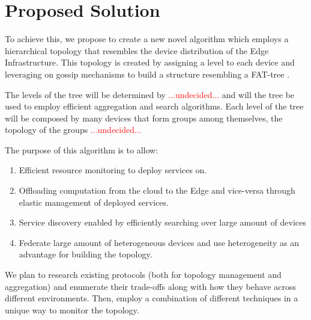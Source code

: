 \chapter{Proposed Solution}
\label{cha:proposed_sol}


To achieve this, we propose to create a new novel algorithm which employs a hierarchical topology that resembles the device distribution of the Edge Infrastructure. This topology is created by assigning a level to each device and leveraging on gossip mechanisms to build a structure resembling a FAT-tree \cite{}.

The levels of the tree will be determined by \textcolor{red}{...undecided...} and will the tree be used to employ efficient aggregation and search algorithms. Each level of the tree will be composed by many devices that form groups among themselves, the topology of the groups \textcolor{red}{...undecided...} 

The purpose of this algorithm is to allow:

\begin{enumerate} 
    \item Efficient resource monitoring to deploy services on.
    \item Offloading computation from the cloud to the Edge and vice-versa through elastic management of deployed services.
    \item Service discovery enabled by efficiently searching over large amount of devices
    \item Federate large amount of heterogeneous devices and use heterogeneity as an advantage for building the topology.
\end{enumerate}

We plan to research existing protocols (both for topology management and aggregation) and enumerate their trade-offs along with how they behave across different environments. Then, employ a combination of different techniques in a unique way to monitor the topology.


